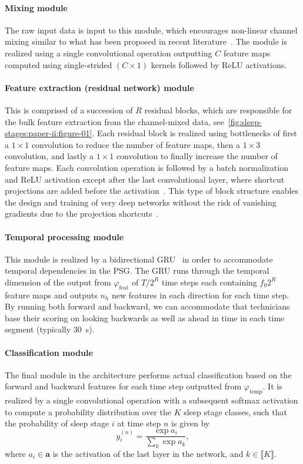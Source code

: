 \paragraph{Mixing module}
The raw input data is input to this module, which encourages non-linear channel mixing similar to what has been proposed in recent literature~\cite{Chambon2018c, Chambon2018b, Chambon2019, Olesen2019}.
The module is realized using a single \twod convolutional operation outputting $C$ feature maps computed using single-strided $(C \times 1)$ kernels followed by \ac{ReLU} activations.

\paragraph{Feature extraction (residual network) module}
This is comprised of a succession of $R$ residual blocks, which are responsible for the bulk feature extraction from the channel-mixed data, see~\cref{fig:sleep-stages:paper-ii:figure-01}.
Each residual block is realized using bottlenecks of first a $1\times 1$ convolution to reduce the number of feature maps, then a $1\times 3$ convolution, and lastly a $1 \times 1$ convolution to finally increase the number of feature maps. 
Each convolution operation is followed by a batch normalization~\cite{Ioffe2015} and ReLU activation except after the last convolutional layer, where shortcut projections are added before the activation~\cite{He2016b}.
This type of block structure enables the design and training of very deep networks without the risk of vanishing gradients due to the projection shortcuts~\cite{He2016}.

\paragraph{Temporal processing module}
This module is realized by a bidirectional \ac{GRU}~\cite{Cho2014} in order to accommodate temporal dependencies in the \ac{PSG}.
The \ac{GRU} runs through the temporal dimension of the output from $\varphi_{\mathrm{feat}}$ of $T/2^R$ time steps each containing $f_0 2^{R}$ feature maps and outputs $n_h$ new features in each direction for each time step.
By running both forward and backward, we can accommodate that technicians base their scoring on looking backwards as well as ahead in time in each time segment (typically \SI{30}{\second}).

\paragraph{Classification module}
The final module in the architecture performs actual classification based on the forward and backward features for each time step outputted from $\varphi_{\mathrm{temp}}$.
It is realized by a single convolutional operation with a subsequent softmax activation to compute a probability distribution over the $K$ sleep stage classes, such that the probability of sleep stage $i$ at time step $n$ is given by
\begin{equation}
   y_i^{(n)} = \frac{\exp{a_i}}{\sum_k{\exp{a_k}}} ,
\end{equation}
where $a_i \in \mathbf{a}$ is the activation of the last layer in the network, and $k \in \llbracket K \rrbracket$.


